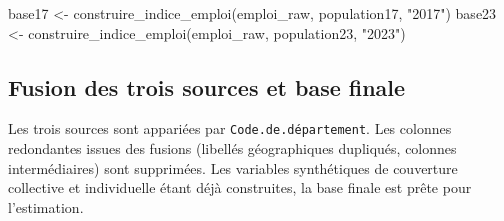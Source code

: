 \documentclass[
  letterpaper,
  DIV=11,
  numbers=noendperiod]{scrartcl}
\newenvironment{Shaded}{\begin{snugshade}}{\end{snugshade}}
\newcommand{\AttributeTok}[1]{\textcolor[rgb]{0.40,0.45,0.13}{#1}}
\newcommand{\ConstantTok}[1]{\textcolor[rgb]{0.56,0.35,0.01}{#1}}
\newcommand{\ControlFlowTok}[1]{\textcolor[rgb]{0.00,0.23,0.31}{\textbf{#1}}}
\newcommand{\FunctionTok}[1]{\textcolor[rgb]{0.28,0.35,0.67}{#1}}
\newcommand{\NormalTok}[1]{\textcolor[rgb]{0.00,0.23,0.31}{#1}}
\newcommand{\OtherTok}[1]{\textcolor[rgb]{0.00,0.23,0.31}{#1}}
\newcommand{\SpecialCharTok}[1]{\textcolor[rgb]{0.37,0.37,0.37}{#1}}
\newcommand{\StringTok}[1]{\textcolor[rgb]{0.13,0.47,0.30}{#1}}
\begin{document}
\begin{Shaded}
\begin{Highlighting}[]
\NormalTok{base17 }\OtherTok{\textless{}{-}} \FunctionTok{construire\_indice\_emploi}\NormalTok{(emploi\_raw, population17, }\StringTok{"2017"}\NormalTok{)}
\NormalTok{base23 }\OtherTok{\textless{}{-}} \FunctionTok{construire\_indice\_emploi}\NormalTok{(emploi\_raw, population23, }\StringTok{"2023"}\NormalTok{)}
\end{Highlighting}
\end{Shaded}

\subsection{Fusion des trois sources et base
finale}\label{fusion-des-trois-sources-et-base-finale}

Les trois sources sont appariées par \texttt{Code.de.département}. Les
colonnes redondantes issues des fusions (libellés géographiques
dupliqués, colonnes intermédiaires) sont supprimées. Les variables
synthétiques de couverture collective et individuelle étant déjà
construites, la base finale est prête pour l'estimation.

\begin{Shaded}
\end{Shaded}
\end{document}
